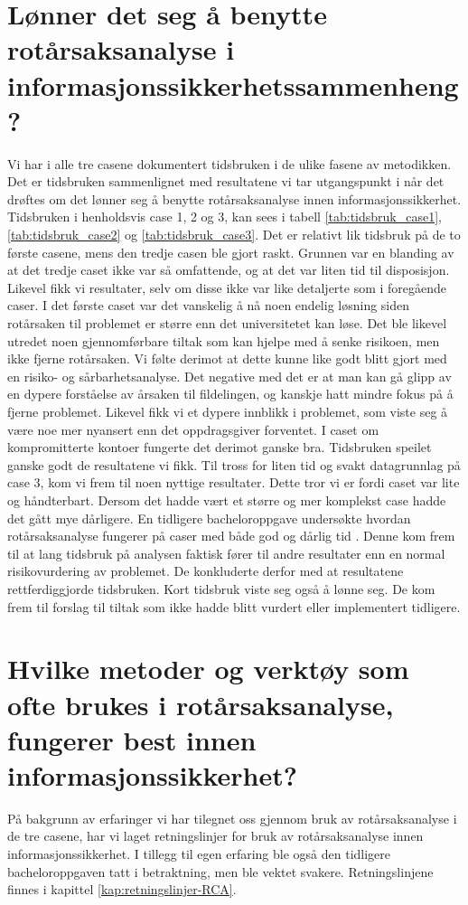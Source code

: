 \section{Lønner det seg å benytte rotårsaksanalyse i informasjonssikkerhetssammenheng?}
Vi har i alle tre casene dokumentert tidsbruken i de ulike fasene av metodikken. Det er tidsbruken sammenlignet med resultatene vi tar utgangspunkt i når det drøftes om det lønner seg å benytte rotårsaksanalyse innen informasjonssikkerhet. Tidsbruken i henholdsvis case 1, 2 og 3, kan sees i tabell \ref{tab:tidsbruk_case1}, \ref{tab:tidsbruk_case2} og \ref{tab:tidsbruk_case3}. Det er relativt lik tidsbruk på de to første casene, mens den tredje casen ble gjort raskt. Grunnen var en blanding av at det tredje caset ikke var så omfattende, og at det var liten tid til disposisjon. Likevel fikk vi resultater, selv om disse ikke var like detaljerte som i foregående caser. I det første caset var det vanskelig å nå noen endelig løsning siden rotårsaken til problemet er større enn det universitetet kan løse. Det ble likevel utredet noen gjennomførbare tiltak som kan hjelpe med å senke risikoen, men ikke fjerne rotårsaken. Vi følte derimot at dette kunne like godt blitt gjort med en risiko- og sårbarhetsanalyse. Det negative med det er at man kan gå glipp av en dypere forståelse av årsaken til fildelingen, og kanskje hatt mindre fokus på å fjerne problemet. Likevel fikk vi et dypere innblikk i problemet, som viste seg å være noe mer nyansert enn det oppdragsgiver forventet. I caset om kompromitterte kontoer fungerte det derimot ganske bra. Tidsbruken speilet ganske godt de resultatene vi fikk. Til tross for liten tid og svakt datagrunnlag på case 3, kom vi frem til noen nyttige resultater. Dette tror vi er fordi caset var lite og håndterbart. Dersom det hadde vært et større og mer komplekst case hadde det gått mye dårligere. En tidligere bacheloroppgave undersøkte hvordan rotårsaksanalyse fungerer på caser med både god og dårlig tid \cite{RCARapport}. Denne kom frem til at lang tidsbruk på analysen faktisk fører til andre resultater enn en normal risikovurdering av problemet. De konkluderte derfor med at resultatene rettferdiggjorde tidsbruken. Kort tidsbruk viste seg også å lønne seg. De kom frem til forslag til tiltak som ikke hadde blitt vurdert eller implementert tidligere. 

\section{Hvilke metoder og verktøy som ofte brukes i rotårsaksanalyse, fungerer best innen informasjonssikkerhet?}
På bakgrunn av erfaringer vi har tilegnet oss gjennom bruk av rotårsaksanalyse i de tre casene, har vi laget retningslinjer for bruk av rotårsaksanalyse innen informasjonssikkerhet. I tillegg til egen erfaring ble også den tidligere bacheloroppgaven \cite{RCARapport} tatt i betraktning, men ble vektet svakere. Retningslinjene finnes i kapittel \ref{kap:retningslinjer-RCA}. 



